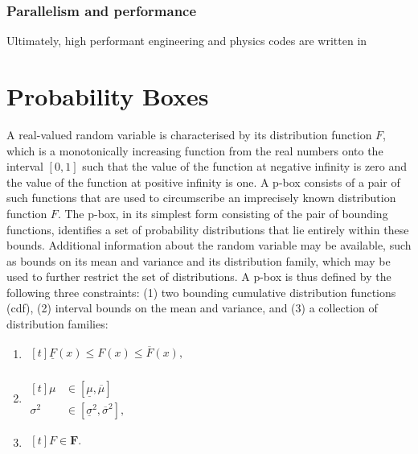 \documentclass{juliacon}
\begin{document}
\subsubsection{Parallelism and performance} \hfill \break

Ultimately, high performant engineering and physics codes are written in 

\fi
\section{Probability Boxes}
\label{sec:pboxes}
A real-valued random variable is characterised by its distribution function $F$, which is a monotonically increasing function from the real numbers onto the interval $[0, 1]$ such that the value of the function at negative infinity is zero and the value of the function at positive infinity is one.  A p-box consists of a pair of such functions that are used to circumscribe an imprecisely known distribution function $F$. The p-box, in its simplest form consisting of the pair of bounding functions, identifies a set of probability distributions that lie entirely within these bounds. Additional information about the random variable may be available, such as bounds on its mean and variance and its distribution family, which may be used to further restrict the set of distributions. A p-box is thus defined by the following three constraints: (1) two bounding cumulative distribution functions (cdf), (2) interval bounds on the mean and variance, and (3) a collection of distribution families:
\begin{enumerate}
  \item $\begin{aligned}[t]
    \underline{F}(x) \leq F(x) \leq \overline{F}(x), \\%
  \end{aligned}$
  \item $\begin{aligned}[t]
    \mu &\in [\underline{ \mu }, \overline{ \mu }]  \\%
    \sigma^2 &\in [\underline{\sigma}^2 , \overline{\sigma}^2],
  \end{aligned}$
  \item $\begin{aligned}[t]
      F \in \bm{F}. \\%
  \end{aligned}$
  \end{enumerate}
\end{document}
